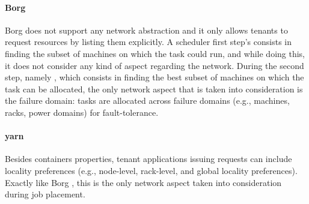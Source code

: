 \paragraph{Borg \texorpdfstring{\cite{borg}}{}}
Borg \cite{borg} does not support any network abstraction and it only allows tenants to request resources by listing them explicitly.
A scheduler first step's consists in finding the subset of machines on which the task could run, and while doing this, it does not consider any kind of aspect regarding the network.
During the second step, namely , which consists in finding the best subset of machines on which the task can be allocated, the only network aspect that is taken into consideration is the failure domain: tasks are allocated across failure domains (e.g., machines, racks, power domains) for fault-tolerance.



\paragraph{\glsdesc{yarn}}
Besides containers properties, tenant applications issuing requests can include locality preferences (e.g., node-level, rack-level, and global locality preferences).
Exactly like Borg \cite{borg}, this is the only network aspect taken into consideration during job placement.